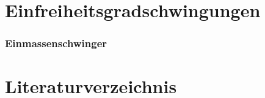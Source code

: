 \documentclass[hyperref={pdfpagemode=FullScreen, colorlinks=false}]{beamer}
\begin{document}
\maketitle

\section{Einfreiheitsgradschwingungen}

\begin{frame}
\frametitle{Einmassenschwinger}



\end{frame}







\section*{Literaturverzeichnis}

\begin{frame}[allowframebreaks]{}
	\printbibliography
\end{frame}
\end{document}

